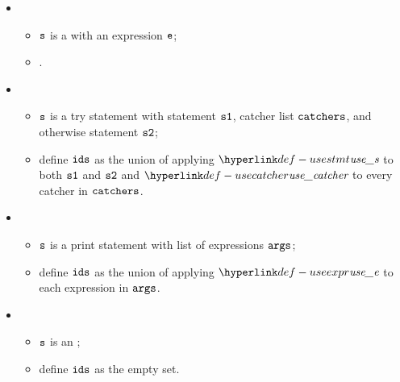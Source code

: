 \begin{itemize}
  \item {}
  \begin{itemize}
    \item $\vs$ is a \throwstatementsterm{} with an expression $\ve$;
    \item {}.
  \end{itemize}

  \item {}
  \begin{itemize}
    \item $\vs$ is a try statement with statement $\vsone$, catcher list $\catchers$, and otherwise statement $\vstwo$;
    \item define $\ids$ as the union of applying $\usestmt$ to both $\vsone$ and $\vstwo$ and $\usecatcher$ to
          every catcher in $\catchers$.
  \end{itemize}

  \item {}
  \begin{itemize}
    \item $\vs$ is a print statement with list of expressions $\vargs$;
    \item define $\ids$ as the union of applying $\useexpr$ to each expression in $\vargs$.
  \end{itemize}

  \item {}
  \begin{itemize}
    \item $\vs$ is an \unreachablestatementterm{};
    \item define $\ids$ as the empty set.
  \end{itemize}
\end{itemize}

\FormallyParagraph
\begin{mathpar}
\end{mathpar}



